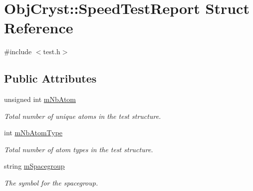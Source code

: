 \hypertarget{struct_obj_cryst_1_1_speed_test_report}{}\section{Obj\+Cryst\+::Speed\+Test\+Report Struct Reference}
\label{struct_obj_cryst_1_1_speed_test_report}


{\ttfamily \#include $<$test.\+h$>$}

\subsection*{Public Attributes}
\begin{DoxyCompactItemize}
\item 
\mbox{\label{struct_obj_cryst_1_1_speed_test_report_a584ea20a9991658acac8f15ea6d2a670}} 
unsigned int \mbox{\hyperlink{struct_obj_cryst_1_1_speed_test_report_a584ea20a9991658acac8f15ea6d2a670}{m\+Nb\+Atom}}
\begin{DoxyCompactList}\small\item\em Total number of unique atoms in the test structure. \end{DoxyCompactList}\item 
\mbox{\label{struct_obj_cryst_1_1_speed_test_report_a755747dca57629b616b12341c110ff7e}} 
int \mbox{\hyperlink{struct_obj_cryst_1_1_speed_test_report_a755747dca57629b616b12341c110ff7e}{m\+Nb\+Atom\+Type}}
\begin{DoxyCompactList}\small\item\em Total number of atom types in the test structure. \end{DoxyCompactList}\item 
\mbox{\label{struct_obj_cryst_1_1_speed_test_report_a73ae4759ba51ae06a745af9040398ccf}} 
string \mbox{\hyperlink{struct_obj_cryst_1_1_speed_test_report_a73ae4759ba51ae06a745af9040398ccf}{m\+Spacegroup}}
\begin{DoxyCompactList}\small\item\em The symbol for the spacegroup. \end{DoxyCompactList}\item 
\mbox{\label{struct_obj_cryst_1_1_speed_test_report_a9407361e047413bd993828c9cfca4cdf}} 

\end{DoxyCompactItemize}
